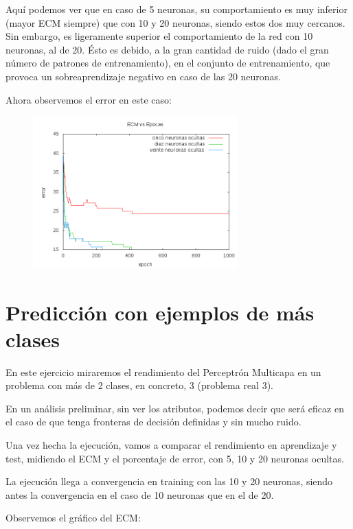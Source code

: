 \documentclass[12pt]{article}
\begin{document}
Aquí podemos ver que en caso de 5 neuronas, su comportamiento es muy inferior (mayor ECM siempre) que con 10 y 20 neuronas, siendo estos dos muy cercanos. Sin embargo, es ligeramente superior el comportamiento de la red con 10 neuronas, al de 20. Ésto es debido, a la gran cantidad de ruido (dado el gran número de patrones de entrenamiento), en el conjunto de entrenamiento, que provoca un sobreaprendizaje negativo en caso de las 20 neuronas.

Ahora observemos el error en este caso:

\begin{figure}[h!]
    \label{fig:error_pr2}
  \centering
       \includegraphics[width=0.7\textwidth]{recursos/error_pr2}
\end{figure} 


\newpage
\section{Predicci\'on con ejemplos de m\'as clases}
En este ejercicio miraremos el rendimiento del Perceptrón Multicapa en un problema con más de 2 clases, en concreto, 3 (problema real 3).

En un análisis preliminar, sin ver los atributos, podemos decir que será eficaz en el caso de que tenga fronteras de decisión definidas y sin mucho ruido.

Una vez hecha la ejecución, vamos a comparar el rendimiento en aprendizaje y test, midiendo el ECM y el porcentaje de error, con 5, 10 y 20 neuronas ocultas.

La ejecución llega a convergencia en training con las 10 y 20 neuronas, siendo antes la convergencia en el caso de 10 neuronas que en el de 20.

Observemos el gráfico del ECM:
\end{document}
